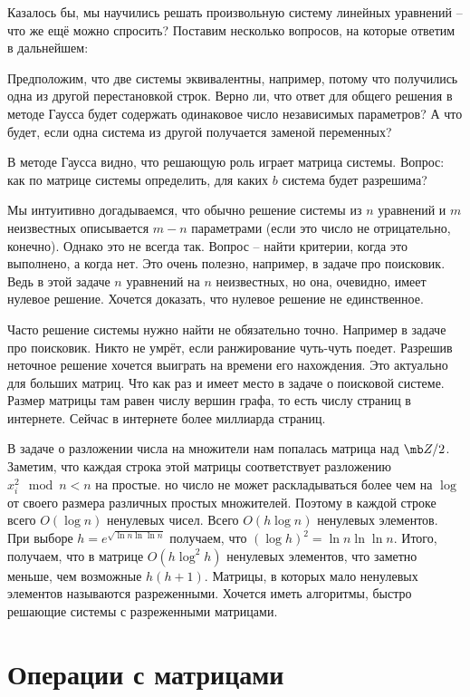 Казалось бы, мы научились решать произвольную систему линейных уравнений -- что же ещё можно спросить? Поставим несколько вопросов, на которые ответим в дальнейшем:
\enm
\item Предположим, что две системы эквивалентны, например, потому что получились одна из другой перестановкой строк. Верно ли, что ответ для общего решения в методе Гаусса будет содержать одинаковое число независимых параметров? А что будет, если одна система из другой получается заменой переменных?
\item В методе Гаусса видно, что решающую роль играет матрица системы. Вопрос: как по матрице системы определить, для каких $b$ система будет разрешима?
\item Мы интуитивно догадываемся, что обычно решение системы из $n$ уравнений и $m$ неизвестных описывается $m-n$ параметрами (если это число не отрицательно, конечно). Однако это не всегда так. Вопрос -- найти критерии, когда это выполнено, а когда нет. Это очень полезно, например, в задаче про поисковик. Ведь в этой задаче $n$ уравнений на $n$ неизвестных, но она, очевидно, имеет нулевое решение. Хочется доказать, что нулевое решение  не единственное.
\item Часто решение системы нужно найти не обязательно точно. Например в задаче про поисковик. Никто не умрёт, если ранжирование чуть-чуть поедет. Разрешив неточное решение хочется выиграть на времени его нахождения. Это актуально для больших матриц. Что как раз  и имеет место в задаче о поисковой системе. Размер матрицы там равен числу вершин графа, то есть числу страниц в интернете. Сейчас в интернете более миллиарда страниц.

\item В задаче о разложении числа на множители нам попалась матрица над $\mb Z/2$. Заметим, что каждая строка этой матрицы соответствует разложению $x_i^2 \mod n < n $ на простые. но число не может раскладываться более чем на $\log$ от своего размера различных простых множителей. Поэтому в каждой строке всего $O(\log n)$ ненулевых чисел.  Всего $O(h \log n )$ ненулевых элементов. При выборе $h=e^{\sqrt{\ln n \ln\ln n}}$ получаем, что $(\log h)^2 = \ln n \ln\ln n$. Итого, получаем, что в матрице  $O(h \log^2 h)$ ненулевых элементов, что заметно меньше, чем возможные $h(h+1)$. Матрицы, в которых мало ненулевых элементов называются разреженными. Хочется иметь алгоритмы, быстро решающие системы с разреженными матрицами.
\eenm


\section{Операции с матрицами}


